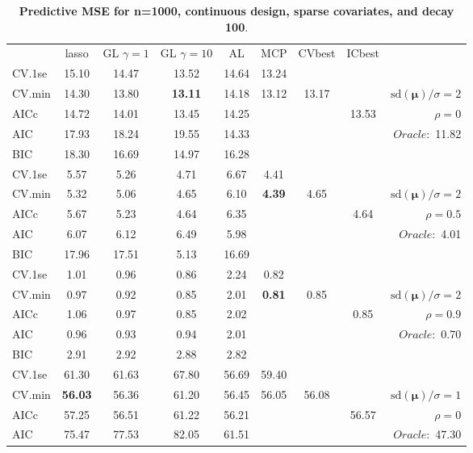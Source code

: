 \begin{table}\vspace{-.5cm}
\caption[l]{ { \bf Predictive MSE for n=1000, continuous design, 
sparse covariates, and  decay  100}.}
\vspace{-.5cm}
\footnotesize{}
\begin{center}
\begin{tabular}{l*{7}{c}|r}
 & lasso & GL $\gamma=1$ & GL $\gamma=10$ & AL & MCP  & CVbest & ICbest  \\
\cline{1-9}
CV.1se & 15.10 & 14.47 & 13.52 & 14.64 & 13.24 & & & \\
CV.min & 14.30 & 13.80 & {\bf 13.11} & 14.18 & 13.12 & 13.17 & & $\mathrm{sd}(\mathbf{\mu})/\sigma=2$ \\
AICc & 14.72 & 14.01 & 13.45 & 14.25 & & & 13.53 &  $\rho=0$ \\
AIC & 17.93 & 18.24 & 19.55 & 14.33 & & & &  \multirow{2}{*}{$Oracle: $ 11.82} \\
BIC & 18.30 & 16.69 & 14.97 & 16.28 & & & &  \\
 \hline 
CV.1se & 5.57 & 5.26 & 4.71 & 6.67 & 4.41 & & & \\
CV.min & 5.32 & 5.06 & 4.65 & 6.10 & {\bf 4.39} & 4.65 & & $\mathrm{sd}(\mathbf{\mu})/\sigma=2$ \\
AICc & 5.67 & 5.23 & 4.64 & 6.35 & & & 4.64 &  $\rho=0.5$ \\
AIC & 6.07 & 6.12 & 6.49 & 5.98 & & & &  \multirow{2}{*}{$Oracle: $ 4.01} \\
BIC & 17.96 & 17.51 & 5.13 & 16.69 & & & &  \\
 \hline 
CV.1se & 1.01 & 0.96 & 0.86 & 2.24 & 0.82 & & & \\
CV.min & 0.97 & 0.92 & 0.85 & 2.01 & {\bf 0.81} & 0.85 & & $\mathrm{sd}(\mathbf{\mu})/\sigma=2$ \\
AICc & 1.06 & 0.97 & 0.85 & 2.02 & & & 0.85 &  $\rho=0.9$ \\
AIC & 0.96 & 0.93 & 0.94 & 2.01 & & & &  \multirow{2}{*}{$Oracle: $ 0.70} \\
BIC & 2.91 & 2.92 & 2.88 & 2.82 & & & &  \\
 \hline 
CV.1se & 61.30 & 61.63 & 67.80 & 56.69 & 59.40 & & & \\
CV.min & {\bf 56.03} & 56.36 & 61.20 & 56.45 & 56.05 & 56.08 & & $\mathrm{sd}(\mathbf{\mu})/\sigma=1$ \\
AICc & 57.25 & 56.51 & 61.22 & 56.21 & & & 56.57 &  $\rho=0$ \\
AIC & 75.47 & 77.53 & 82.05 & 61.51 & & & &  \multirow{2}{*}{$Oracle: $ 47.30} \\

\end{tabular}
\end{center}
\end{table}
